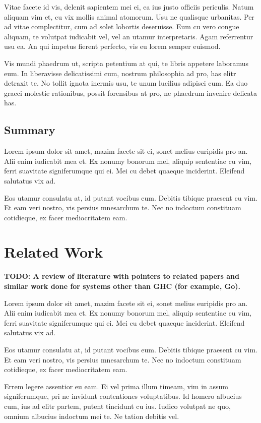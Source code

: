 \documentclass[a4paper,11pt,oneside]{report}
\begin{document}
Vitae facete id vis, delenit sapientem mei ei, ea ius justo officiis
periculis. Natum aliquam vim et, cu vix mollis animal atomorum. Usu ne qualisque
urbanitas. Per ad vitae complectitur, cum ad solet lobortis deseruisse. Eum cu
vero congue aliquam, te volutpat iudicabit vel, vel an utamur
interpretaris. Agam referrentur usu ea. An qui impetus fierent perfecto, vis eu
lorem semper euismod.

Vis mundi phaedrum ut, scripta petentium at qui, te libris appetere laboramus
eum. In liberavisse delicatissimi cum, nostrum philosophia ad pro, has elitr
detraxit te. No tollit ignota inermis usu, te unum lucilius adipisci cum. Ea duo
graeci molestie rationibus, possit forensibus at pro, ne phaedrum invenire
delicata has.

\section{Summary}

Lorem ipsum dolor sit amet, mazim facete sit ei, sonet melius euripidis pro
an. Alii enim iudicabit mea et. Ex nonumy bonorum mel, aliquip sententiae cu
vim, ferri suavitate signiferumque qui ei. Mei cu debet quaeque
inciderint. Eleifend salutatus vix ad.

Eos utamur consulatu at, id putant vocibus eum. Debitis tibique praesent cu
vim. Et eam veri nostro, vis persius mnesarchum te. Nec no indoctum constituam
cotidieque, ex facer mediocritatem eam.


\chapter{Related Work}
\label{chap:related-work}

\textbf{TODO: A review of literature with pointers to related papers and similar
  work done for systems other than GHC (for example, Go). }

Lorem ipsum dolor sit amet, mazim facete sit ei, sonet melius euripidis pro
an. Alii enim iudicabit mea et. Ex nonumy bonorum mel, aliquip sententiae cu
vim, ferri suavitate signiferumque qui ei. Mei cu debet quaeque
inciderint. Eleifend salutatus vix ad.

Eos utamur consulatu at, id putant vocibus eum. Debitis tibique praesent cu
vim. Et eam veri nostro, vis persius mnesarchum te. Nec no indoctum constituam
cotidieque, ex facer mediocritatem eam.

Errem legere assentior eu eam. Ei vel prima illum timeam, vim in assum
signiferumque, pri ne invidunt contentiones voluptatibus. Id homero albucius
cum, ius ad elitr partem, putent tincidunt cu ius. Iudico volutpat ne quo,
omnium albucius indoctum mei te. Ne tation debitis vel.
\end{document}
